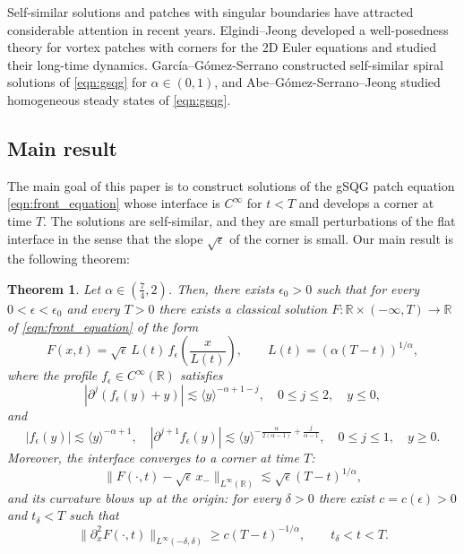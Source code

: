 \documentclass[11pt]{amsart}
\newtheorem{theorem}{Theorem}[section]
\theoremstyle{definition}
\theoremstyle{remark}
\numberwithin{equation}{section}
\newcommand{\R}{\mathbb{R}}
\newcommand{\ang}[1]{\langle #1 \rangle}
\begin{document}
Self-similar solutions and patches with singular boundaries have attracted considerable attention in recent years. Elgindi--Jeong \cite{Elgindi-Jeong:singular-vortex-patches-i,Elgindi-Jeong:singular-vortex-patches-ii} developed a well-posedness theory for vortex patches with corners for the 2D Euler equations and studied their long-time dynamics. Garc\'ia--G\'omez-Serrano \cite{Garcia-GomezSerrano:self-similar-spirals-gsqg} constructed self-similar spiral solutions of \eqref{eqn:gsqg} for $\alpha \in (0,1)$, and Abe--G\'omez-Serrano--Jeong \cite{Abe-GomezSerrano-Jeong:homogeneous-steady-states-gsqg} studied homogeneous steady states of \eqref{eqn:gsqg}.

\subsection{Main result}

The main goal of this paper is to construct solutions of the gSQG patch equation \eqref{eqn:front_equation} whose interface is $C^\infty$ for $t < T$ and develops a corner at time $T$. The solutions are self-similar, and they are small perturbations of the flat interface in the sense that the slope $\sqrt{\epsilon}$ of the corner is small. Our main result is the following theorem:

\begin{theorem}\label{thm:main}
Let $\alpha \in (\frac{7}{4}, 2)$. Then, there exists $\epsilon_0 > 0$ such that for every $0 < \epsilon < \epsilon_0$ and every $T > 0$ there exists a classical solution $F : \R \times (-\infty, T) \to \R$ of \eqref{eqn:front_equation} of the form
\begin{equation}\label{eqn:intro_self_similar_ansatz}
    F(x,t) = \sqrt{\epsilon}\,L(t)\, f_\epsilon\left(\frac{x}{L(t)}\right), \qquad L(t) = (\alpha(T-t))^{1/\alpha},
\end{equation}
where the profile $f_\epsilon \in C^\infty(\R)$ satisfies
\[|\partial^j(f_\epsilon(y) + y)| \lesssim \ang{y}^{-\alpha + 1 -j}, \quad 0 \leq j \leq 2, \quad y \leq 0,\]
and
\[|f_\epsilon(y)| \lesssim \ang{y}^{-\alpha + 1}, \quad |\partial^{j+1} f_\epsilon(y)| \lesssim \ang{y}^{-\frac{\alpha}{2(\alpha-1)} + \frac{j}{\alpha - 1}}, \quad 0 \leq j \leq 1, \quad y \geq 0.\]
Moreover, the interface converges to a corner at time $T$:
\begin{equation}\label{eqn:intro_corner_convergence}
    \|F(\cdot, t) - \sqrt{\epsilon}\, x_-\|_{L^\infty(\R)} \lesssim \sqrt{\epsilon} (T - t)^{1/\alpha},
\end{equation}
and its curvature blows up at the origin: for every $\delta > 0$ there exist $c = c(\epsilon) > 0$ and $t_\delta < T$ such that
\begin{equation}\label{eqn:intro_curvature_blowup}
    \|\partial_x^2 F(\cdot, t)\|_{L^\infty(-\delta, \delta)} \geq c (T-t)^{-1/\alpha}, \qquad t_\delta < t < T.
\end{equation}
\end{theorem}
\end{document}
